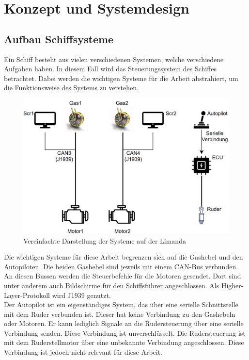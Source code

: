 \chapter{Konzept und Systemdesign}

\section{Aufbau Schiffsysteme}
Ein Schiff besteht aus vielen verschiedenen Systemen, welche verschiedene Aufgaben haben. In diesem Fall wird das
Steuerungssystem des Schiffes betrachtet. Dabei werden die wichtigen Systeme für die Arbeit abstrahiert, um die
Funktionsweise des Systems zu verstehen.
\begin{figure}[H]
    \centering
    \includegraphics[scale=0.3]{images/limandaSystem.png}
    \caption{Vereinfachte Darstellung der Systeme auf der Limanda}
\end{figure}
Die wichtigen Systeme für diese Arbeit begrenzen sich auf die Gashebel und den Autopiloten. Die beiden Gashebel sind jeweils
mit einem CAN-Bus verbunden. An diesen Bussen werden die Steuerbefehle für die Motoren gesendet. Dort sind unter anderem 
auch Bildschirme für den Schiffsführer angeschlossen. Als Higher-Layer-Protokoll wird J1939 genutzt. \\
Der Autopilot ist ein eigenständiges System, das über eine serielle Schnittstelle mit dem Ruder verbunden ist.
Dieser hat keine Verbindung zu den Gashebeln oder Motoren. Er kann lediglich Signale an die Rudersteuerung über
eine serielle Verbindung senden. Diese Verbindung ist unverschlüsselt.
Die Rudersteuerung ist mit dem Ruderstellmotor über eine unbekannte Verbindung angeschlossen. Diese Verbindung ist
jedoch nicht relevant für diese Arbeit.\\



